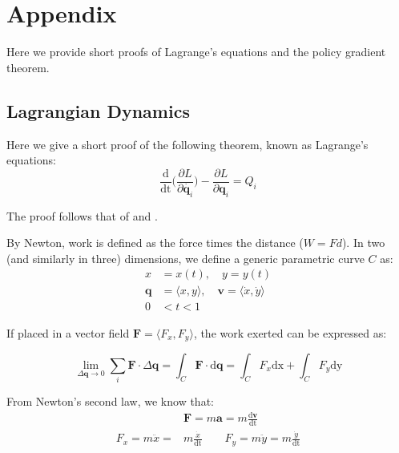 \documentclass{article}
\begin{document}
\newcommand{\prob}{\text{P}}
\renewcommand{\vec}[1]{\mathbf{#1}}
\newcommand{\dotvec}[1]{\mathbf{\dot{#1}}}
\renewcommand{\d}[1]{\mathrm{d#1}}

\section{Appendix}
Here we provide short proofs of Lagrange's equations and the policy gradient theorem.
\subsection{Lagrangian Dynamics}
Here we give a short proof of the following theorem, known as Lagrange's equations:
\begin{equation*}
    \frac{\d{}}{\d{t}} \bigg( \frac{\partial L}{\partial \dot{\vec{q}_i}} \bigg) - \frac{\partial L}{\partial \vec{q}_i} = Q_i
\end{equation*}

The proof follows that of \cite[Section~1.5]{zak2003systems} and \cite{koskie}.

By Newton, work is defined as the force times the distance ($W = Fd$). In two (and similarly in three) dimensions, we define a generic parametric curve $C$ as:
\begin{align*}
    x &= x(t), \quad y = y(t) \\
    \vec{q} &= \langle x, y \rangle, \quad \vec{v} = \langle \dot{x}, \dot{y} \rangle \\
    0 &< t < 1
\end{align*}

If placed in a vector field $\vec{F} = \langle F_x, F_y \rangle$, the work exerted can be expressed as:

\begin{equation} \label{eq:work}
    \lim_{\Delta \vec{q} \to 0} \sum_i \vec{F} \cdot \Delta \vec{q} = 
        \int_C \vec{F} \cdot \d{\vec{q}} = 
        \int_C F_x \d{x} + \int_C F_y \d{y}
\end{equation}



From Newton's second law, we know that:
\begin{align*}
    &\vec{F} = m \vec{a} = m \frac{\d{\vec{v}}}{\d{t}} \\
    F_x = m \ddot{x} = &m \frac{\dot{x}}{\d{t}} \quad\quad F_y = m \ddot{y} = m \frac{\dot{y}}{\d{t}}
\end{align*}
\end{document}
